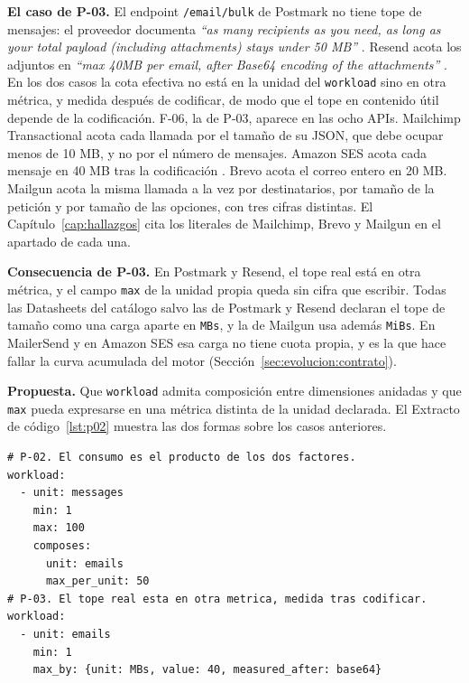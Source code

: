 \textbf{El caso de P-03.} El endpoint \texttt{/email/bulk} de Postmark no tiene
tope de mensajes: el proveedor documenta \textit{``as many recipients as you need,
as long as your total payload (including attachments) stays under 50 MB''}
\citep{postmarkapi}. Resend acota los adjuntos en \textit{``max 40MB per email,
after Base64 encoding of the attachments''} \citep{resenddocs}. En los dos casos
la cota efectiva no está en la unidad del \texttt{workload} sino en otra métrica,
y medida después de codificar, de modo que el tope en contenido útil depende de la
codificación.
F-06, la de P-03, aparece en las ocho APIs.
Mailchimp Transactional acota cada llamada por el tamaño de su JSON, que debe ocupar menos de 10 MB, y no por el número de mensajes.
Amazon SES acota cada mensaje en 40 MB tras la codificación \citep{sesdocs}.
Brevo acota el correo entero en 20 MB.
Mailgun acota la misma llamada a la vez por destinatarios, por tamaño de la petición y por tamaño de las opciones, con tres cifras distintas.
El Capítulo~\ref{cap:hallazgos} cita los literales de Mailchimp, Brevo y Mailgun en el apartado de cada una.

\textbf{Consecuencia de P-03.} En Postmark y Resend, el tope real está en otra métrica, y el campo \texttt{max} de la unidad propia queda sin cifra que escribir.
Todas las Datasheets del catálogo salvo las de Postmark y Resend declaran el tope de tamaño como una carga aparte en \texttt{MBs}, y la de Mailgun usa además \texttt{MiBs}.
En MailerSend y en Amazon SES esa carga no tiene cuota propia, y es la que hace fallar la curva acumulada del motor (Sección~\ref{sec:evolucion:contrato}).

\textbf{Propuesta.} Que \texttt{workload} admita composición entre dimensiones
anidadas y que \texttt{max} pueda expresarse en una métrica distinta de la unidad
declarada. El Extracto de código~\ref{lst:p02} muestra las dos formas sobre los
casos anteriores.

\begin{lstlisting}[style=datasheetyaml,caption={P-02 y P-03: composición de dimensiones anidadas y cota expresada en otra métrica.},label={lst:p02}]
# P-02. El consumo es el producto de los dos factores.
workload:
  - unit: messages
    min: 1
    max: 100
    composes:
      unit: emails
      max_per_unit: 50
# P-03. El tope real esta en otra metrica, medida tras codificar.
workload:
  - unit: emails
    min: 1
    max_by: {unit: MBs, value: 40, measured_after: base64}
\end{lstlisting}

